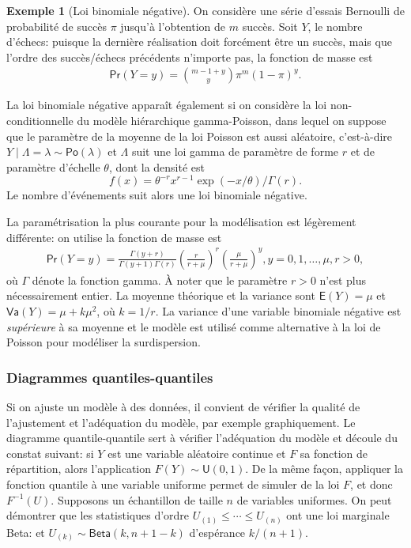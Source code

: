 \documentclass[
  11pt,
  letterpaper,
]{article}
\theoremstyle{definition}
\theoremstyle{definition}
\newtheorem{example}{Exemple}[section]
\theoremstyle{definition}
\theoremstyle{definition}
\theoremstyle{remark}
\begin{document}
\begin{example}[Loi binomiale négative]
\protect\hypertarget{exm:loibinneg}{}\label{exm:loibinneg}On considère une série d'essais Bernoulli de probabilité de succès \(\pi\) jusqu'à l'obtention de \(m\) succès. Soit \(Y\), le nombre d'échecs: puisque la dernière réalisation doit forcément être un succès, mais que l'ordre des succès/échecs précédents n'importe pas, la fonction de masse est
\begin{align*}
\mathsf{Pr}(Y=y)= \binom{m-1+y}{y} \pi^m (1-\pi)^{y}.
\end{align*}

La loi binomiale négative apparaît également si on considère la loi non-conditionnelle du modèle hiérarchique gamma-Poisson, dans lequel on suppose que le paramètre de la moyenne de la loi Poisson est aussi aléatoire, c'est-à-dire \(Y \mid \Lambda=\lambda \sim \mathsf{Po}(\lambda)\) et \(\Lambda\) suit une loi gamma de paramètre de forme \(r\) et de paramètre d'échelle \(\theta\), dont la densité est \[f(x) = \theta^{-r}x^{r-1}\exp(-x/\theta)/\Gamma(r).\] Le nombre d'événements suit alors une loi binomiale négative.

La paramétrisation la plus courante pour la modélisation est légèrement différente: on utilise la fonction de masse est
\begin{align*}
\mathsf{Pr}(Y=y)=\frac{\Gamma(y+r)}{\Gamma(y+1)\Gamma(r)} \left(\frac{r}{r + \mu} \right)^{r} \left(\frac{\mu}{r+\mu}\right)^y, y=0, 1, \ldots, \mu,r >0,
\end{align*}
où \(\Gamma\) dénote la fonction gamma. À noter que le paramètre \(r>0\) n'est plus nécessairement entier. La moyenne théorique et la variance sont
\(\mathsf{E}(Y)=\mu\) et \(\mathsf{Va}(Y)=\mu+k\mu^2\), où \(k=1/r\). La variance d'une variable binomiale négative est \emph{supérieure} à sa moyenne et le modèle est utilisé comme alternative à la loi de Poisson pour modéliser la surdispersion.
\end{example}

\hypertarget{diagramme-qq}{%
\subsubsection{Diagrammes quantiles-quantiles}\label{diagramme-qq}}

Si on ajuste un modèle à des données, il convient de vérifier la qualité de l'ajustement et l'adéquation du modèle, par exemple graphiquement. Le diagramme quantile-quantile sert à vérifier l'adéquation du modèle et découle du constat suivant: si \(Y\) est une variable aléatoire continue et \(F\) sa fonction de répartition, alors l'application \(F(Y) \sim \mathsf{U}(0,1)\). De la même façon, appliquer la fonction quantile à une variable uniforme permet de simuler de la loi \(F\), et donc \(F^{-1}(U)\). Supposons un échantillon de taille \(n\) de variables uniformes. On peut démontrer que les statistiques d'ordre \(U_{(1)} \leq \cdots \leq U_{(n)}\) ont une loi marginale Beta: et \(U_{(k)} \sim \mathsf{Beta}(k, n+1-k)\) d'espérance \(k/(n+1)\).
\end{document}
